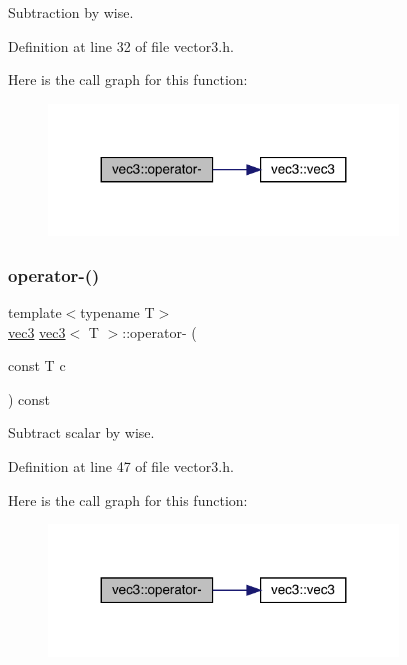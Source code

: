 Subtraction by wise. 



Definition at line 32 of file vector3.\+h.

Here is the call graph for this function\+:\nopagebreak
\begin{figure}[H]
\begin{center}
\leavevmode
\includegraphics[width=263pt]{structvec3_a62ca43535073d9711fe179e26a412e32_cgraph}
\end{center}
\end{figure}
\mbox{\label{structvec3_a4c45d24dd69ba07e484e2951933d2f97}} 
\subsubsection{\texorpdfstring{operator-\/()}{operator-()}\hspace{0.1cm}{\footnotesize\ttfamily [2/3]}}
{\footnotesize\ttfamily template$<$typename T$>$ \\
\mbox{\hyperlink{structvec3}{vec3}} \mbox{\hyperlink{structvec3}{vec3}}$<$ T $>$\+::operator-\/ (\begin{DoxyParamCaption}\item[{const T}]{c }\end{DoxyParamCaption}) const\hspace{0.3cm}{\ttfamily [inline]}}



Subtract scalar by wise. 



Definition at line 47 of file vector3.\+h.

Here is the call graph for this function\+:\nopagebreak
\begin{figure}[H]
\begin{center}
\leavevmode
\includegraphics[width=263pt]{structvec3_a4c45d24dd69ba07e484e2951933d2f97_cgraph}
\end{center}
\end{figure}
\mbox{\label{structvec3_a9ee0d5d83bd70141b9424928d0ea9c98}} 
